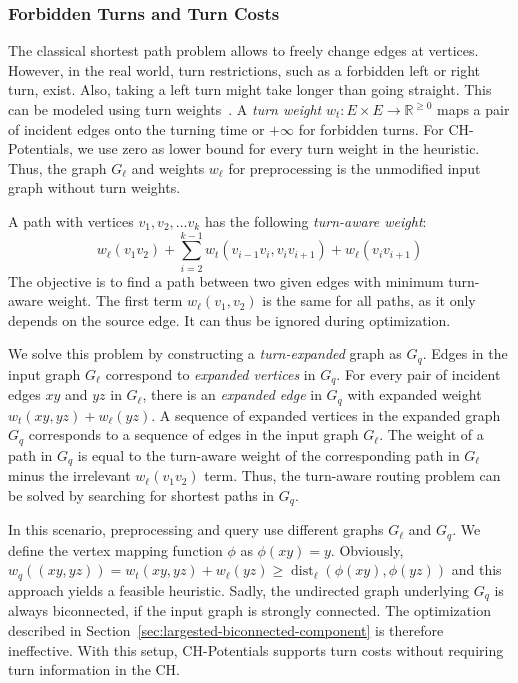 \documentclass[manuscript,review]{acmart}
\newcommand*{\dist}{\operatorname{dist}}
\begin{document}
\subsubsection{Forbidden Turns and Turn Costs}
\label{sec:no-turns}

The classical shortest path problem allows to freely change edges at vertices.
However, in the real world, turn restrictions, such as a forbidden left or right turn, exist.
Also, taking a left turn might take longer than going straight.
This can be modeled using turn weights~\cite{gv-errnt-11,dgpw-crprn-13,bwzz-cchtc-20}.
A \emph{turn weight} $w_t : E \times E \to \mathbb{R}^{\geq 0}$ maps a pair of incident edges onto the turning time or $+\infty$ for forbidden turns.
For CH-Potentials, we use zero as lower bound for every turn weight in the heuristic.
Thus, the graph $G_\ell$ and weights $w_\ell$ for preprocessing is the unmodified input graph without turn weights.

A path with vertices $v_1, v_2,\ldots v_k$ has the following \emph{turn-aware weight}: \[
w_\ell(v_1 v_2) + \sum_{i=2}^{k-1}  w_t(v_{i-1} v_i, v_i v_{i+1}) + w_\ell(v_i v_{i+1})
\]
The objective is to find a path between two given edges with minimum turn-aware weight.
The first term $w_\ell(v_1, v_2)$ is the same for all paths, as it only depends on the source edge.
It can thus be ignored during optimization.

We solve this problem by constructing a \emph{turn-expanded} graph as $G_q$.
Edges in the input graph $G_\ell$ correspond to \emph{expanded vertices} in $G_q$.
For every pair of incident edges $x y$ and $y z$ in $G_\ell$, there is an \emph{expanded edge} in $G_q$ with expanded weight $w_t(xy,yz) + w_\ell(y z)$.
A sequence of expanded vertices in the expanded graph $G_q$ corresponds to a sequence of edges in the input graph $G_\ell$.
The weight of a path in $G_q$ is equal to the turn-aware weight of the corresponding path in $G_\ell$ minus the irrelevant $w_\ell(v_1 v_2)$ term.
Thus, the turn-aware routing problem can be solved by searching for shortest paths in $G_q$.

In this scenario, preprocessing and query use different graphs $G_\ell$ and $G_q$.
We define the vertex mapping function $\phi$ as $\phi(x y) = y$.
Obviously, $w_q((xy, yz)) = w_t(xy,yz) + w_\ell(y z) \geq \dist_\ell(\phi(x y), \phi(y z))$ and this approach yields a feasible heuristic.
Sadly, the undirected graph underlying $G_q$ is always biconnected, if the input graph is strongly connected.
The optimization described in Section~\ref{sec:largested-biconnected-component} is therefore ineffective.
With this setup, CH-Potentials supports turn costs without requiring turn information in the CH.
\end{document}
